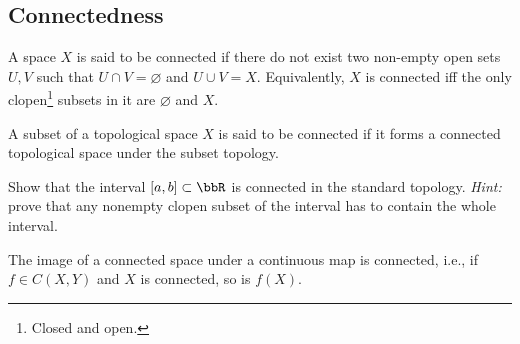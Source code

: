 



\subsection{Connectedness}

\begin{defn}
A space $X$ is said to be connected if there do not exist two non-empty open sets $U,V$ such that $U\cap V=\varnothing$ and $U\cup V=X$.
Equivalently, $X$ is connected iff the only clopen\footnote{Closed and open.} subsets in it are $\varnothing$ and $X$.
\end{defn}


\begin{defn}
A subset of a topological space $X$ is said to be connected if it forms a connected topological space under the subset topology.
\end{defn}

\begin{xca}
Show that the interval $[a,b]\subset\bbR $ is connected in the standard topology. \emph{Hint:} prove that any nonempty clopen subset of the interval has to contain the whole interval.
\end{xca}


\begin{prop}
The image of a connected space under a continuous map is connected, i.e., if $f\in C(X,Y)$ and $X$ is connected, so is $f(X)$.
\end{prop}

